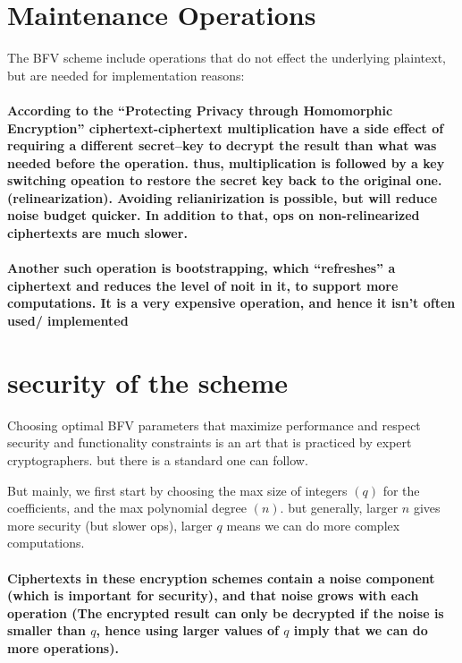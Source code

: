 \section{Maintenance Operations}

The BFV scheme include operations that do not effect the underlying
plaintext, but are needed for implementation reasons:

\paragraph{According to the ``Protecting Privacy through Homomorphic Encryption''
ciphertext-ciphertext multiplication have a side effect of requiring
a different secret--key to decrypt the result than what was needed
before the operation. thus, multiplication is followed by a key switching
opeation to restore the secret key back to the original one. (relinearization).
Avoiding relianirization is possible, but will reduce noise budget
quicker. In addition to that, ops on non-relinearized ciphertexts
are much slower.}

\paragraph{Another such operation is \textbf{bootstrapping}, which ``refreshes''
a ciphertext and reduces the level of noit in it, to support more
computations. It is a very expensive operation, and hence it isn't
often used/ implemented}

\section{security of the scheme}

Choosing optimal BFV parameters that maximize performance and respect
security and functionality constraints is an art that is practiced
by expert cryptographers. but there is a standard one can follow.

But mainly, we first start by choosing the max size of integers $\left(q\right)$
for the coefficients, and the max polynomial degree $\left(n\right)$.
but generally, larger $n$ gives more security (but slower ops), larger
$q$ means we can do more complex computations. 

\paragraph{Ciphertexts in these encryption schemes contain a noise component
(which is important for security), and that noise grows with each
operation (The encrypted result can only be decrypted if the noise
is smaller than $q$, hence using larger values of $q$ imply that
we can do more operations).}

